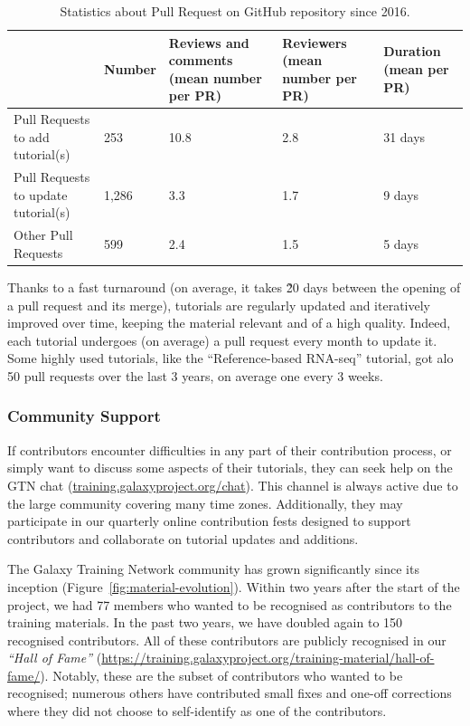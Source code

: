 \documentclass[10pt,letterpaper]{article}
\begin{document}
\begin{table}[]
\begin{adjustwidth}{-2.25in}{0in} %
	\centering
	\caption{Statistics about Pull Request on GitHub repository since 2016.\label{tbl:pullRequestReviewing}}
	\begin{tabular}{l|p{}p{}p{}p{}}
 & Number & Reviews and comments (mean number per PR) & Reviewers (mean number per PR) & Duration (mean per PR) \\\hline
Pull Requests to add tutorial(s)  & 253  & 10.8  & 2.8 & 31 days\\
Pull Requests to update tutorial(s) & 1,286 & 3.3 & 1.7 & 9 days\\
Other Pull Requests & 599 & 2.4 & 1.5 & 5 days\\
	\end{tabular}
\end{adjustwidth}
\end{table}

Thanks to a fast turnaround (on average, it takes \~20 days between the opening of a pull request and its merge), tutorials are regularly updated and iteratively improved over time, keeping the material relevant and of a high quality.
Indeed, each tutorial undergoes (on average) a pull request every month to update it. Some highly used tutorials, like the “Reference-based RNA-seq” tutorial, got alo 50 pull requests over the last 3 years, on average one every 3 weeks.

\subsubsection*{Community Support}

If contributors encounter difficulties in any part of their contribution process, or simply want to discuss some aspects of their tutorials, they can seek help on the GTN chat (\url{training.galaxyproject.org/chat}). This channel is always active due to the large community covering many time zones.
Additionally, they may participate in our quarterly online contribution fests designed to support contributors and collaborate on tutorial updates and additions.

The Galaxy Training Network community has grown significantly since its inception (Figure~\ref{fig:material-evolution}).
Within two years after the start of the project, we had 77 members who wanted to be recognised as contributors to the training materials.
In the past two years, we have doubled again to 150 recognised contributors.
All of these contributors are publicly recognised in our \emph{“Hall of Fame”} (\url{https://training.galaxyproject.org/training-material/hall-of-fame/}).
Notably, these are the subset of contributors who wanted to be recognised; numerous others have contributed small fixes and one-off corrections where they did not choose to self-identify as one of the contributors.
\end{document}

